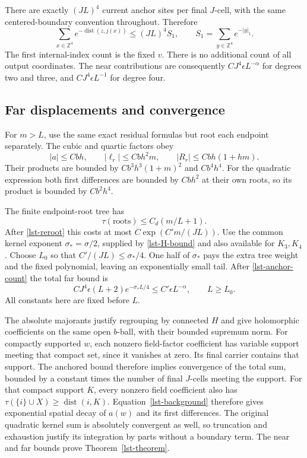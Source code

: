 \documentclass[11pt]{article}
\theoremstyle{remark}
\begin{document}
There are exactly \((JL)^4\) current anchor sites
per final \(J\)-cell, with the same centered-boundary
convention throughout. Therefore
\begin{equation}
 \sum_{x\in\mathbb Z^4}
 e^{-\operatorname{dist}(z,j(x))}
 \le (JL)^4 S_1,\qquad
 S_1=\sum_{y\in\mathbb Z^4}e^{-|y|_1}.
 \label{lst-anchor-count}
\end{equation}
The first internal-index count is the fixed \(v\).
There is no additional count of all output coordinates.
The near contributions are consequently
\(CJ^4\epsilon L^{-\alpha}\) for degrees two and
three, and \(CJ^4\epsilon L^{-1}\) for degree four.

\subsection{Far displacements and convergence}
\label{lst-far-section}

For \(m>L\), use the same exact residual formulas but
root each endpoint separately. The cubic and quartic
factors obey
\[
 |a|\le Cbh,\qquad
 |\ell_r|\le Cbh^2m,\qquad
 |R_r|\le Cbh(1+hm).
\]
Their products are bounded by
\(Cb^3h^3(1+m)^2\) and \(Cb^4h^4\).
For the quadratic expression both first differences
are bounded by \(Cbh^2\) at their own roots, so its
product is bounded by \(Cb^2h^4\).

The finite endpoint-root tree has
\[
 \tau(\text{roots})\le C_d(m/L+1).
\]
After \eqref{lst-reroot} this costs at most
\(C\exp(C'm/(JL))\). Use the common kernel exponent
\(\sigma_*=\sigma/2\), supplied by \eqref{lst-H-bound}
and also available for \(K_3,K_4\). Choose \(L_0\)
so that \(C'/(JL)\le\sigma_*/4\). One half of
\(\sigma_*\) pays the extra tree weight and the fixed
polynomial, leaving an exponentially small tail.
After \eqref{lst-anchor-count} the total far bound is
\begin{equation}
 CJ^4\epsilon(L+2)e^{-\sigma_*L/4}
                 \le C'\epsilon L^{-\alpha},
       \qquad L\ge L_0 .
 \label{lst-far-bound}
\end{equation}
All constants here are fixed before \(L\).

The absolute majorants justify regrouping by connected
\(H\) and give holomorphic coefficients on the same
open \(b\)-ball, with their bounded supremum norm.
For compactly supported \(w\), each nonzero field-factor
coefficient has variable support meeting that compact
set, since it vanishes at zero. Its final carrier
contains that support. The anchored bound therefore
implies convergence of the total sum, bounded by a
constant times the number of final \(J\)-cells meeting
the support. For that compact support \(K\), every
nonzero field coefficient also has
\(\tau(\{i\}\cup X)\ge\operatorname{dist}(i,K)\).
Equation~\eqref{lst-background} therefore gives
exponential spatial decay of \(a(w)\) and its first
differences. The original quadratic kernel sum is
absolutely convergent as well, so truncation and
exhaustion justify its integration by parts without
a boundary term. The near and far
bounds prove Theorem~\ref{lst-theorem}.
\end{document}
